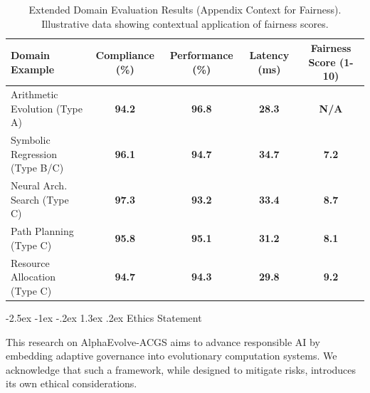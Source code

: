 \documentclass[manuscript,screen,review,anonymous,9pt]{acmart}
\makeatletter
\renewcommand\section{\@startsection{section}{1}{\z@}%
  {-2.5ex \@plus -1ex \@minus -.2ex}%
  {1.3ex \@plus.2ex}%
  {\normalfont\Large\bfseries}}
\newcommand{\tablesize}{\footnotesize}
\newcommand{\tablenumfmt}[1]{\textbf{#1}}
\newcommand{\tableheader}[1]{\textbf{#1}}
\makeatother
\begin{document}
\begin{table}[htbp]
\centering
\caption{Extended Domain Evaluation Results (Appendix Context for Fairness). Illustrative data showing contextual application of fairness scores.}
\label{tab:appendix_extended_domain_results_fairness}
\tablesize
\begin{tabular}{@{}lcccc@{}}
\toprule
\tableheader{Domain Example} & \tableheader{Compliance (\%)} & \tableheader{Performance (\%)} & \tableheader{Latency (ms)} & \tableheader{Fairness Score (1-10)} \\
\midrule
Arithmetic Evolution (Type A) & \tablenumfmt{94.2} & \tablenumfmt{96.8} & \tablenumfmt{28.3} & \tablenumfmt{N/A} \\
Symbolic Regression (Type B/C) & \tablenumfmt{96.1} & \tablenumfmt{94.7} & \tablenumfmt{34.7} & \tablenumfmt{7.2} \\
Neural Arch. Search (Type C) & \tablenumfmt{97.3} & \tablenumfmt{93.2} & \tablenumfmt{33.4} & \tablenumfmt{8.7} \\
Path Planning (Type C) & \tablenumfmt{95.8} & \tablenumfmt{95.1} & \tablenumfmt{31.2} & \tablenumfmt{8.1} \\
Resource Allocation (Type C) & \tablenumfmt{94.7} & \tablenumfmt{94.3} & \tablenumfmt{29.8} & \tablenumfmt{9.2} \\
\bottomrule
\end{tabular}
\end{table}

\section{Ethics Statement}
\label{sec:ethics}

This research on AlphaEvolve-ACGS aims to advance responsible AI by embedding adaptive governance into evolutionary computation systems. We acknowledge that such a framework, while designed to mitigate risks, introduces its own ethical considerations.
\end{document}
